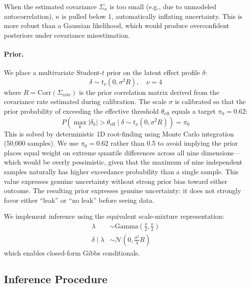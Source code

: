 When the estimated covariance $\Sigma_n$ is too small (e.g., due to unmodeled autocorrelation), $\kappa$ is pulled below 1, automatically inflating uncertainty. This is more robust than a Gaussian likelihood, which would produce overconfident posteriors under covariance misestimation.

\paragraph{Prior.}
We place a multivariate Student-$t$ prior on the latent effect profile $\delta$:
\begin{equation}
\delta \sim t_\nu(0, \sigma^2 R), \quad \nu = 4
\end{equation}
where $R = \text{Corr}(\Sigma_{\text{rate}})$ is the prior correlation matrix derived from the covariance rate estimated during calibration. The scale $\sigma$ is calibrated so that the prior probability of exceeding the effective threshold $\theta_{\text{eff}}$ equals a target $\pi_0 = 0.62$:
\begin{equation}
P\!\left(\max_k |\delta_k| > \theta_{\text{eff}} \mid \delta \sim t_\nu(0, \sigma^2 R)\right) = \pi_0
\end{equation}
This is solved by deterministic 1D root-finding using Monte Carlo integration (50,000 samples). We use $\pi_0 = 0.62$ rather than 0.5 to avoid implying the prior places equal weight on extreme quantile differences across all nine dimensions—which would be overly pessimistic, given that the maximum of nine independent samples naturally has higher exceedance probability than a single sample. This value expresses genuine uncertainty without strong prior bias toward either outcome. The resulting prior expresses genuine uncertainty: it does not strongly favor either ``leak'' or ``no leak'' before seeing data.

We implement inference using the equivalent scale-mixture representation:
\begin{align}
\lambda &\sim \text{Gamma}\!\left(\frac{\nu}{2}, \frac{\nu}{2}\right) \\
\delta \mid \lambda &\sim \mathcal{N}\!\left(0, \frac{\sigma^2}{\lambda} R\right)
\end{align}
which enables closed-form Gibbs conditionals.

\subsection{Inference Procedure}
\label{app:inference}

